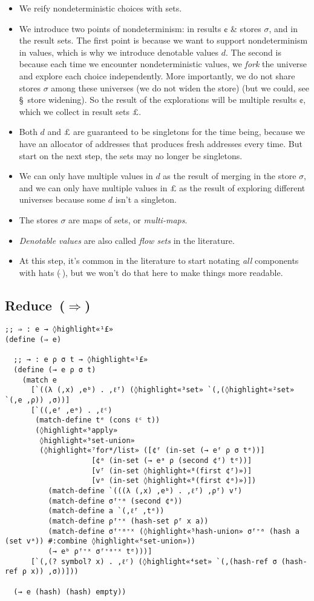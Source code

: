 \documentclass[12pt, oneside]{book}
\begin{document}
\begin{itemize}
  \item We reify nondeterministic choices with sets.
  \item We introduce two points of nondeterminism: in results \(¢\) \& stores \(σ\), and in the result sets. The first point is because we want to support nondeterminism in values, which is why we introduce denotable values \(d\). The second is because each time we encounter nondeterministic values, we \emph{fork} the universe and explore each choice independently. More importantly, we do not share stores \(σ\) among these universes (we do not widen the store) (but we could, see §~store widening). So the result of the explorations will be multiple results \(¢\), which we collect in result sets \(£\).
  \item Both \(d\) and \(£\) are guaranteed to be singletons for the time being, because we have an allocator of addresses that produces fresh addresses every time. But start on the next step, the sets may no longer be singletons.
  \item We can only have multiple values in \(d\) as the result of merging in the store \(σ\), and we can only have multiple values in \(£\) as the result of exploring different universes because some \(d\) isn’t a singleton.
  \item The stores \(σ\) are maps of sets, or \emph{multi-maps}.
  \item \emph{Denotable values} are also called \emph{flow sets} in the literature.
  \item At this step, it’s common in the literature to start notating \emph{all} components with hats (\(\hat{~}\)), but we won’t do that here to make things more readable.
\end{itemize}

\subsection{Reduce~(\(⇒\))}

\begin{Verbatim}
;; ⇒ : e → ◊highlight«¹£»
(define (⇒ e)

  ;; → : e ρ σ t → ◊highlight«¹£»
  (define (→ e ρ σ t)
    (match e
      [`((λ (,x) ,eᵇ) . ,ℓᶠ) (◊highlight«³set» `(,(◊highlight«²set» `(,e ,ρ)) ,σ))]
      [`((,eᶠ ,eᵃ) . ,ℓᶜ)
       (match-define tᵉ (cons ℓᶜ t))
       (◊highlight«⁹apply»
        ◊highlight«⁹set-union»
        (◊highlight«⁷for*/list» ([¢ᶠ (in-set (→ eᶠ ρ σ tᵉ))]
                    [¢ᵃ (in-set (→ eᵃ ρ (second ¢ᶠ) tᵉ))]
                    [vᶠ (in-set ◊highlight«⁸(first ¢ᶠ)»)]
                    [vᵃ (in-set ◊highlight«⁸(first ¢ᵃ)»)])
          (match-define `(((λ (,x) ,eᵇ) . ,ℓᶠ) ,ρᶠ) vᶠ)
          (match-define σᶠ⁺ᵃ (second ¢ᵃ))
          (match-define a `(,ℓᶠ ,tᵉ))
          (match-define ρᶠ⁺ˣ (hash-set ρᶠ x a))
          (match-define σᶠ⁺ᵃ⁺ˣ (◊highlight«⁵hash-union» σᶠ⁺ᵃ (hash a (set vᵃ)) #:combine ◊highlight«⁶set-union»))
          (→ eᵇ ρᶠ⁺ˣ σᶠ⁺ᵃ⁺ˣ tᵉ)))]
      [`(,(? symbol? x) . ,ℓʳ) (◊highlight«⁴set» `(,(hash-ref σ (hash-ref ρ x)) ,σ))]))

  (→ e (hash) (hash) empty))
\end{Verbatim}
\end{document}
